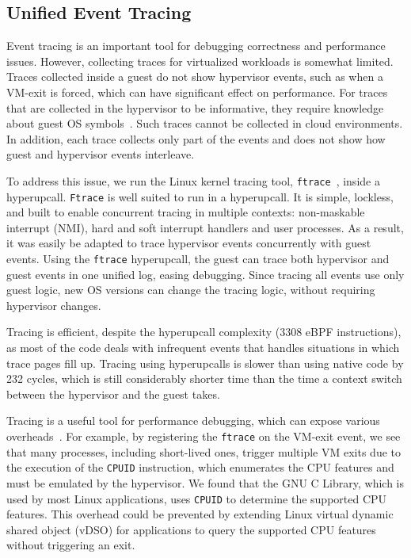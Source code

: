 \documentclass[11pt]{article}
\newcommand{\hypercallback}{hyperupcall\xspace{}}
\begin{document}
\subsection{Unified Event Tracing}
Event tracing is an important tool for debugging correctness
and performance issues. However, collecting traces for virtualized workloads 
is somewhat limited. Traces collected
inside a guest do not show hypervisor events, such as when a VM-exit is forced,
 which can have significant
effect on performance. For traces that are collected in the hypervisor
to be informative, they require knowledge about guest OS symbols~\cite{carbone14vprobes}. 
Such traces cannot be collected in cloud environments. In addition,
each trace collects only part of the events and does
not show how guest and hypervisor events interleave.

To address this issue, we run the Linux kernel tracing tool, \texttt{ftrace}~\cite{ftrace},
inside a \hypercallback. \texttt{Ftrace} is well suited to run in a \hypercallback. 
It is simple, lockless,
and built to enable concurrent tracing in multiple contexts: non-maskable
interrupt (NMI), hard and soft interrupt handlers and user processes.
As a result, it was easily be adapted to trace hypervisor events
 concurrently with guest events.
Using the \texttt{ftrace} \hypercallback, the guest can trace both hypervisor
and guest events in one unified log, easing debugging. Since tracing
all events use only guest logic, new OS versions can change the tracing logic, without requiring
hypervisor changes. 

Tracing is efficient, despite the \hypercallback
complexity (3308 eBPF instructions), as most of the code deals
with infrequent events that handles situations in which trace
pages fill up. Tracing using  \hypercallback{}s is slower than using
native code by 232 cycles, which
is still considerably shorter time than the time a context switch between the
hypervisor and the guest takes.

Tracing is a useful tool for performance debugging, which can
expose various overheads~\cite{zheng2009warp}. For example, 
by registering the \texttt{ftrace} on the VM-exit event, we see
that many processes, including short-lived ones, trigger multiple
VM exits due to the execution of the \texttt{CPUID} instruction, 
which enumerates the CPU
features and must be emulated by the hypervisor. We found
that the GNU C Library, which is
used by most Linux applications, uses \texttt{CPUID} 
to determine the supported CPU features. This overhead 
could be prevented by extending Linux virtual dynamic shared 
object (vDSO) for applications to query the supported CPU features
without triggering an exit.
\end{document}
